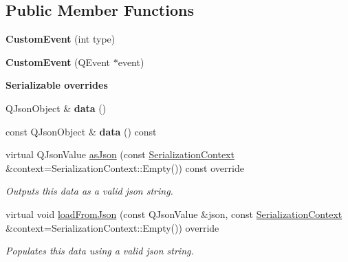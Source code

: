 \subsection*{Public Member Functions}
\begin{DoxyCompactItemize}
\item 
\mbox{\label{classrev_1_1_custom_event_a58f96f4d7e29bc75f0e7b812b1d7ed07}} 
{\bfseries Custom\+Event} (int type)
\item 
\mbox{\label{classrev_1_1_custom_event_a2614a5999997a16d327d2e1601f3d16e}} 
{\bfseries Custom\+Event} (Q\+Event $\ast$event)
\end{DoxyCompactItemize}
\begin{Indent}\textbf{ Serializable overrides}\par
\begin{DoxyCompactItemize}
\item 
\mbox{\label{classrev_1_1_custom_event_a769ba9e104e5ed8fb1a352df17efc38e}} 
Q\+Json\+Object \& {\bfseries data} ()
\item 
\mbox{\label{classrev_1_1_custom_event_aa45d10b61c871cc3f0e82f2c03c81595}} 
const Q\+Json\+Object \& {\bfseries data} () const
\item 
\mbox{\label{classrev_1_1_custom_event_a13184ee2a211bdee4c611388678db596}} 
virtual Q\+Json\+Value \mbox{\hyperlink{classrev_1_1_custom_event_a13184ee2a211bdee4c611388678db596}{as\+Json}} (const \mbox{\hyperlink{structrev_1_1_serialization_context}{Serialization\+Context}} \&context=Serialization\+Context\+::\+Empty()) const override
\begin{DoxyCompactList}\small\item\em Outputs this data as a valid json string. \end{DoxyCompactList}\item 
\mbox{\label{classrev_1_1_custom_event_aeefca6f67194b80da5ed26bcad544e6f}} 
virtual void \mbox{\hyperlink{classrev_1_1_custom_event_aeefca6f67194b80da5ed26bcad544e6f}{load\+From\+Json}} (const Q\+Json\+Value \&json, const \mbox{\hyperlink{structrev_1_1_serialization_context}{Serialization\+Context}} \&context=Serialization\+Context\+::\+Empty()) override
\begin{DoxyCompactList}\small\item\em Populates this data using a valid json string. \end{DoxyCompactList}\end{DoxyCompactItemize}
\end{Indent}
